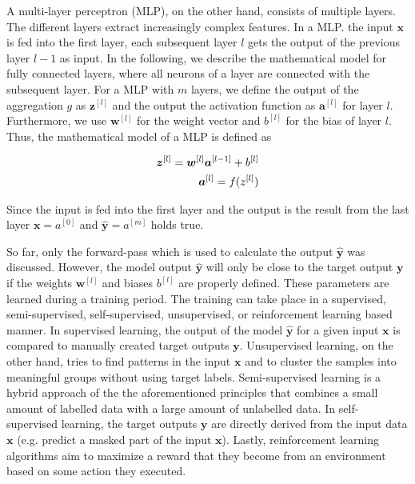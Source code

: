 A multi-layer perceptron (MLP), on the other hand, consists of multiple layers.
The different layers extract increasingly complex features.
In a MLP. the input \(\boldsymbol{x}\) is fed into the first layer, each subsequent layer \(l\) gets the output of the previous layer \(l-1\) as input.
In the following, we describe the mathematical model for fully connected layers, where all neurons of a layer are connected with the subsequent layer.
For a MLP with \(m\) layers, we define the output of the aggregation \(g\) as \(\boldsymbol{z}^{[l]}\) and the output the activation function as \(\boldsymbol{a}^{[l]}\) for layer \(l\).
Furthermore, we use \(\boldsymbol{w}^{[l]}\) for the weight vector and \(b^{[l]}\) for the bias of layer \(l\).
Thus, the mathematical model of a MLP is defined as

\begin{equation}\eqlbl{mlp}
	\begin{aligned}
		\boldsymbol{z}^{[l]} = \boldsymbol{w}^{[l]}\boldsymbol{a}^{[l-1]} + b^{[l]}\\
		\boldsymbol{a}^{[l]} = f({z}^{[l]})
	\end{aligned}
\end{equation}

Since the input is fed into the first layer and the output is the result from the last layer \(\boldsymbol{x} = {a}^{[0]}\) and \(\boldsymbol{\hat{y}} = {a}^{[m]}\) holds true.

So far, only the forward-pass which is used to calculate the output \(\boldsymbol{\hat{y}}\) was discussed.
However, the model output \(\boldsymbol{\hat{y}}\) will only be close to the target output \(\boldsymbol{y}\) if the weights \(\boldsymbol{w}^{[l]}\) and biases \(b^{[l]}\) are properly defined.
These parameters are learned during a training period.
The training can take place in a supervised, semi-supervised, self-supervised, unsupervised, or reinforcement learning based manner.
In supervised learning, the output of the model \(\boldsymbol{\hat{y}}\) for a given input \(\boldsymbol{x}\) is compared to manually created target outputs \(\boldsymbol{y}\).
Unsupervised learning, on the other hand, tries to find patterns in the input \(\boldsymbol{x}\) and to cluster the samples into meaningful groups without using target labels.
Semi-supervised learning is a hybrid approach of the the aforementioned principles that combines a small amount of labelled data with a large amount of unlabelled data.
In self-supervised learning, the target outputs \(\boldsymbol{y}\) are directly derived from the input data \(\boldsymbol{x}\) (e.g. predict a masked part of the input \(\boldsymbol{x}\)).
Lastly, reinforcement learning algorithms aim to maximize a reward that they become from an environment based on some action they executed.

